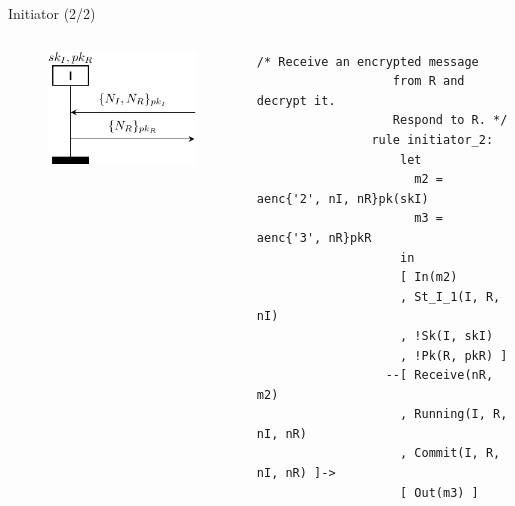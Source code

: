\documentclass[11pt,aspectratio=169]{beamer}
\begin{document}
\begin{frame}[fragile]{Initiator (2/2)}
    \begin{columns}
        \begin{column}{0.5\textwidth}
            \begin{figure}
                \includegraphics[width=.8\textwidth]
                    {./figures/lecture_3/nspk_i2}
            \end{figure}
        \end{column}
        \begin{column}{0.5\textwidth}
            \begin{lstlisting}[style=tamarin, gobble=16]
                /* Receive an encrypted message
                   from R and decrypt it.
                   Respond to R. */
                rule initiator_2:
                    let
                      m2 = aenc{'2', nI, nR}pk(skI)
                      m3 = aenc{'3', nR}pkR
                    in
                    [ In(m2)
                    , St_I_1(I, R, nI)
                    , !Sk(I, skI)
                    , !Pk(R, pkR) ]
                  --[ Receive(nR, m2)
                    , Running(I, R, nI, nR)
                    , Commit(I, R, nI, nR) ]->
                    [ Out(m3) ]
            \end{lstlisting}
        \end{column}
    \end{columns}
    \vsep
\end{frame}
\end{document}
